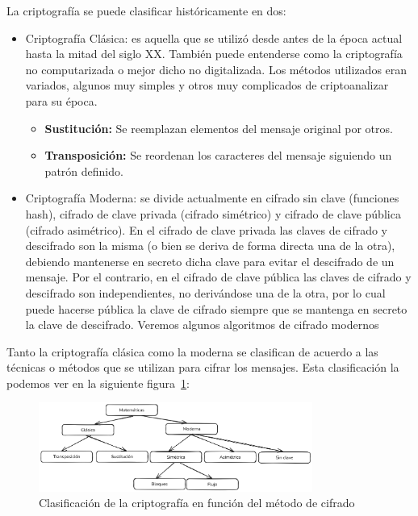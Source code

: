 La criptografía se puede clasificar históricamente en dos:
\begin{itemize}
    \item Criptografía Clásica: es aquella que se utilizó desde antes de la época actual hasta la mitad del siglo XX. También puede entenderse como la criptografía no computarizada o mejor dicho no digitalizada. Los métodos utilizados eran variados, algunos muy simples y otros muy complicados de criptoanalizar para su época. 
    \begin{itemize}
        \item \textbf{Sustitución:} Se reemplazan elementos del mensaje original por otros.
        \item \textbf{Transposición:} Se reordenan los caracteres del mensaje siguiendo un patrón definido.
    \end{itemize}
    
    \item Criptografía Moderna: se divide actualmente en cifrado sin clave (funciones hash), cifrado de clave privada (cifrado simétrico) y cifrado de clave pública (cifrado asimétrico). En el cifrado de clave privada las claves de cifrado y descifrado son la misma (o bien se deriva de forma directa una de la otra), debiendo mantenerse en secreto dicha clave para evitar el descifrado de un mensaje. Por el contrario, en el cifrado de clave pública las claves de cifrado y descifrado son independientes, no derivándose una de la otra, por lo cual puede hacerse pública la clave de cifrado siempre que se mantenga en secreto la clave de descifrado. Veremos algunos algoritmos de cifrado modernos
\end{itemize}

Tanto la criptografía clásica como la moderna se clasifican de acuerdo a las técnicas o métodos que se utilizan para cifrar los mensajes. Esta clasificación la podemos ver en la siguiente figura~\ref{fig:clasificacion_criptografia}:

\begin{figure}[H]
    \centering
    \includegraphics[width=0.8\textwidth]{imagenes/Clasificación_criptografía.png}
    \caption{Clasificación de la criptografía en función del método de cifrado}
    \label{fig:clasificacion_criptografia}
\end{figure}

